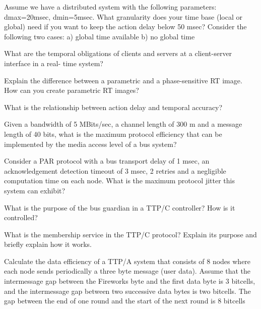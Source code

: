 
Assume we have a distributed system with the following parameters: dmax=20msec,
dmin=5msec. What granularity does your time base (local or global) need if you want to
keep the action delay below 50 msec? Consider the following two cases:
a) global time available
b) no global time



What are the temporal obligations of clients and servers at a client-server interface in a real-
time system?



Explain the difference between a parametric and a phase-sensitive RT image. How can you
create parametric RT images?



What is the relationship between action delay and temporal accuracy?



Given a bandwidth of 5 MBits/sec, a channel length of 300 m and a message length of 40
bits, what is the maximum protocol efficiency that can be implemented by the media access
level of a bus system?


 Consider a PAR protocol with a bus transport delay of 1 msec, an acknowledgement
detection timeout of 3 msec, 2 retries and a negligible computation time on each node. What
is the maximum protocol jitter this system can exhibit?



What is the purpose of the bus guardian in a TTP/C controller? How is it controlled?


What is the membership service in the TTP/C protocol? Explain its purpose and briefly
explain how it works.



 Calculate the data efficiency of a TTP/A system that consists of 8 nodes where each node
sends periodically a three byte message (user data). Assume that the intermessage gap
between the Fireworks byte and the first data byte is 3 bitcells, and the intermessage gap
between two successive data bytes is two bitcells. The gap between the end of one round
and the start of the next round is 8 bitcells


